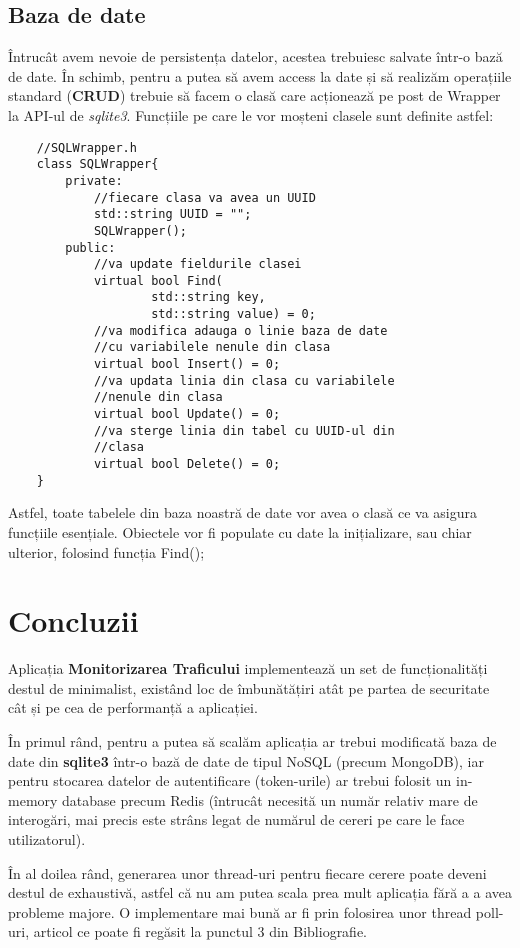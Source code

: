 \documentclass{article}
\begin{document}
\subsection{Baza de date}
Întrucât avem nevoie de persistența datelor, acestea trebuiesc salvate într-o bază de date. În schimb, pentru a putea să avem access la date și să realizăm operațiile standard (\textbf{CRUD}) trebuie să facem o clasă care acționează pe post de Wrapper la API-ul de \textit{sqlite3}. Funcțiile pe care le vor moșteni clasele sunt definite astfel:

\begin{lstlisting}
    //SQLWrapper.h
    class SQLWrapper{
        private:
            //fiecare clasa va avea un UUID
            std::string UUID = "";
            SQLWrapper();
        public:
            //va update fieldurile clasei
            virtual bool Find(
                    std::string key, 
                    std::string value) = 0;
            //va modifica adauga o linie baza de date 
            //cu variabilele nenule din clasa
            virtual bool Insert() = 0;
            //va updata linia din clasa cu variabilele
            //nenule din clasa
            virtual bool Update() = 0;
            //va sterge linia din tabel cu UUID-ul din 
            //clasa
            virtual bool Delete() = 0;            
    }
\end{lstlisting}

Astfel, toate tabelele din baza noastră de date vor avea o clasă ce va asigura funcțiile esențiale. Obiectele vor fi populate cu date la inițializare, sau chiar ulterior, folosind funcția Find();

\section{Concluzii}
Aplicația \textbf{Monitorizarea Traficului} implementează un set de funcționalități destul de minimalist, existând loc de îmbunătățiri atât pe partea de securitate cât și pe cea de performanță a aplicației. 

În primul rând, pentru a putea să scalăm aplicația ar trebui modificată baza de date din \textbf{sqlite3} într-o bază de date de tipul NoSQL (precum MongoDB), iar pentru stocarea datelor de autentificare (token-urile) ar trebui folosit un in-memory database precum Redis (întrucât necesită un număr relativ mare de interogări, mai precis este strâns legat de numărul de cereri pe care le face utilizatorul).

În al doilea rând, generarea unor thread-uri pentru fiecare cerere poate deveni destul de exhaustivă, astfel că nu am putea scala prea mult aplicația fără a a avea probleme majore. O implementare mai bună ar fi prin folosirea unor thread poll-uri, articol ce poate fi regăsit la punctul 3 din Bibliografie. 
\end{document}
